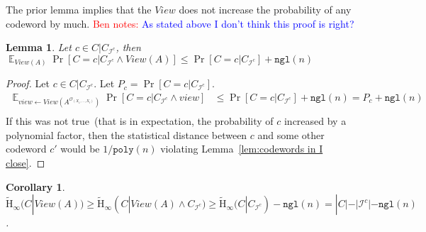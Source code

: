 \documentclass[11pt]{article}
\newcommand{\lemref}[1]{\mbox{Lemma~\ref{#1}}}
\DeclareMathOperator*{\expe}{\mathbb{E}}
\newcommand{\poly}{\ensuremath{\mathtt{poly}}\xspace}
\newcommand{\ngl}{\ensuremath{\mathtt{ngl}}\xspace}
\newcommand{\Hav}{\tilde{\mathrm{H}}_\infty}
\newtheorem{lemma}[theorem]{Lemma}
\newtheorem{corollary}[theorem]{Corollary}
\newcommand{\authnote}[2]{{\textcolor{red}{\textsf{#1 notes: }\textcolor{blue}{ #2}}\marginpar{\textcolor{red}{\textbf{!!!!!}}}}}
\newcommand{\authnote}[2]{}
\newcommand{\bnote}[1]{{\authnote{Ben}{#1}}}
\begin{document}
The prior lemma implies that the $View$ does not increase the probability of any codeword by much.
\bnote{As stated above I don't think this proof is right?}
\begin{lemma}
Let $c\in C|C_{\mathcal{I}^c}$, then $\expe_{View(A)} \Pr[C=c | C_{\mathcal{I}^c} \wedge View(A)] \leq \Pr[C=c | C_{\mathcal{I}^c}]+\ngl(n)$
\end{lemma}
\begin{proof}
Let $c\in C|C_{\mathcal{I}^c}$.  Let $P_c =\Pr[C=c | C_{\mathcal{I}^c}]$.  
\begin{align*}
\expe_{view \leftarrow View(A^{\mathcal{O}_{(X_1,..., X_\ell)}})}\Pr[C=c | C_{\mathcal{I}^c} \wedge view ] &\leq \Pr[C=c | C_{\mathcal{I}^c} ]+ \ngl(n) = P_c+\ngl(n)\\
\end{align*}
If this was not true~(that is in expectation, the probability of $c$ increased by a polynomial factor, then the statistical distance between $c$ and some other codeword $c'$ would be $1/\poly(n)$ violating \lemref{lem:codewords in I close}.
\end{proof}
\begin{corollary}
\label{cor:avg min after view}
$\Hav(C| View(A))\geq \Hav(C | View (A) \wedge C_{\mathcal{I}^c}) \geq  \Hav(C | C_{\mathcal{I}^c}) - \ngl(n) = |C| - |\mathcal{I}^c| - \ngl(n)$.
\end{corollary}
\end{document}
